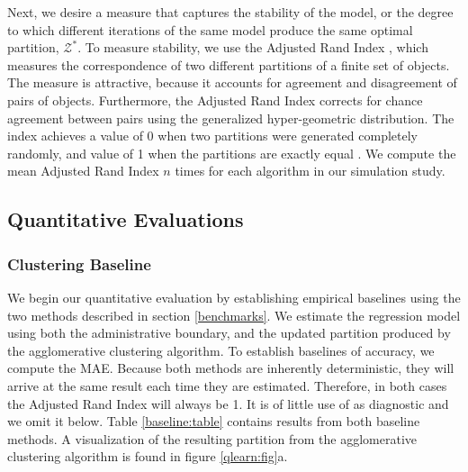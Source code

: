 Next, we desire a measure that captures the stability of the model, or the degree to which different iterations of the same model produce the same optimal partition, $\mathcal{Z}^*$. To measure stability, we use the Adjusted Rand Index \cite{rand:hubert}, which measures the correspondence of two different partitions of a finite set of objects. The measure is attractive, because it accounts for agreement and disagreement of pairs of objects. Furthermore, the Adjusted Rand Index corrects for chance agreement between pairs using the generalized hyper-geometric distribution. The index achieves a value of 0 when two partitions were generated completely randomly, and value of 1 when the partitions are exactly equal \cite{rand:hubert, ml:murphy}. We compute the mean Adjusted Rand Index $n$ times for each algorithm in our simulation study. \\

%


\subsection{Quantitative Evaluations} \label{results}

\subsubsection{Clustering Baseline}
We begin our quantitative evaluation by establishing empirical baselines using the two methods described in section \ref{benchmarks}. We estimate the regression model using both the administrative boundary, and the updated partition produced by the agglomerative clustering algorithm. To establish baselines of accuracy, we compute the MAE. Because both methods are inherently deterministic, they will arrive at the same result each time they are estimated. Therefore, in both cases the Adjusted Rand Index will always be 1. It is of little use of as diagnostic and we omit it below. Table \ref{baseline:table} contains results from both baseline methods. A visualization of the resulting partition from the agglomerative clustering algorithm is found in figure \ref{qlearn:fig}a.

